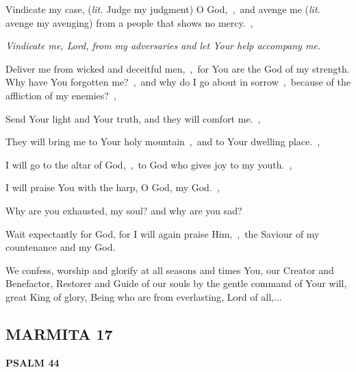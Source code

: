 \documentclass[12pt,twoside,a5paper]{article}
\newcommand{\marmita}[1]{\subsection*{MARMITA {#1}}}
\newcommand{\psalm}[1]{\textbf{PSALM {#1}}\nopagebreak}
\newcommand{\qanona}[1]{{\liturgicalhint{Qanona.} \emph{#1}}}
\newcommand{\slota}[1]{\liturgicalhint{Slota.} #1}
\newcommand{\translationliteral}[1]{\emph{lit.} #1}
\begin{document}
\begin{normalparskip}
  Vindicate my case, (\translationliteral{Judge my judgment}) O God,~\sep\ and avenge me (\translationliteral{avenge my avenging}) from a people that shows no mercy.~\sep

  \qanona{Vindicate me, Lord, from my adversaries and let Your help accompany me.}

  Deliver me from wicked and deceitful men,~\sep\ for You are the God of my strength. Why have You forgotten me?~\sep\ and why do I go about in sorrow~\sep\ because of the affliction of my enemies?~\sep

  Send Your light and Your truth, and they will comfort me.~\sep

  They will bring me to Your holy mountain~\sep\ and to Your dwelling place.~\sep

  I will go to the altar of God,~\sep\ to God who gives joy to my youth.~\sep

  I will praise You with the harp, O God, my God.~\sep

  Why are you exhausted, my soul? and why are you sad?

  Wait expectantly for God, for I will again praise Him,~\sep\ the Saviour of my countenance and my God.
\end{normalparskip}

\slota{We confess, worship and glorify at all seasons and times You, our Creator and Benefactor, Restorer and Guide of our souls by the gentle command of Your will, great King of glory, Being who are from everlasting, Lord of all,...}

\marmita{17}

\psalm{44}
\end{document}
